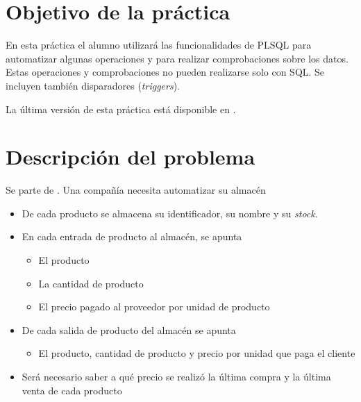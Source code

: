 
\usepackage{needspace}




\renewcommand{\hmwkTitle}{Práctica PLSQL con triggers}
\renewcommand{\hmwkClass}{Gestión de Bases de datos}







\primerapagina


\section{Objetivo de la práctica}
En esta práctica el alumno utilizará las funcionalidades de PLSQL para automatizar algunas operaciones y para realizar comprobaciones sobre los datos. Estas operaciones y comprobaciones no pueden realizarse solo con SQL. Se incluyen también disparadores (\textit{triggers}).

La última versión de esta práctica está disponible en .


\section{Descripción del problema}
Se parte de . Una compañía necesita automatizar su almacén
\begin{itemize}
\item De cada producto se almacena su identificador, su nombre y su \textit{stock}.
\item En cada entrada de producto al almacén, se apunta
  \begin{itemize}
  \item El producto
  \item La cantidad de producto
  \item El precio pagado al proveedor por unidad de producto
  \end{itemize}
\item De cada salida de producto del almacén se apunta
  \begin{itemize}
  \item El producto, cantidad de producto y precio por unidad que paga el cliente
  \end{itemize}
\item Será necesario saber a qué precio se realizó la última compra y la última venta de cada producto  
\end{itemize}

